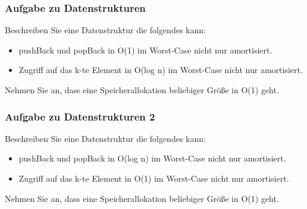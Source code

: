 \begin{frame}
\frametitle{Aufgabe zu Datenstrukturen}
Beschreiben Sie eine Datenstruktur die folgendes kann:
\begin{itemize}
\item pushBack und popBack in O(1) im Worst-Case nicht nur amortisiert.
\item Zugriff auf das k-te Element in O(log n) im Worst-Case nicht nur amortisiert.
\end{itemize}
Nehmen Sie an, dass eine Speicherallokation beliebiger Größe in O(1) geht.
\end{frame}

\begin{frame}
\frametitle{Aufgabe zu Datenstrukturen 2}
Beschreiben Sie eine Datenstruktur die folgendes kann:
\begin{itemize}
\item pushBack und popBack in O(log n) im Worst-Case nicht nur amortisiert.
\item Zugriff auf das k-te Element in O(1) im Worst-Case nicht nur amortisiert.
\end{itemize}
Nehmen Sie an, dass eine Speicherallokation beliebiger Größe in O(1) geht.
\end{frame}
